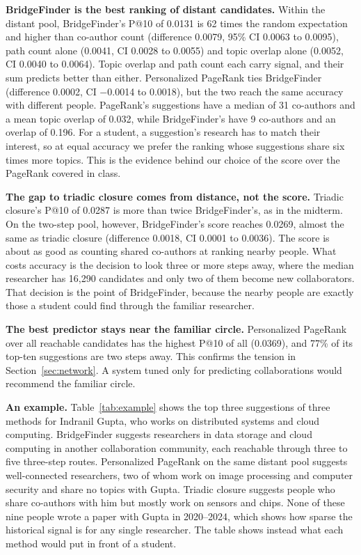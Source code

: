 \documentclass[sigconf,nonacm]{acmart}
\begin{document}
\textbf{BridgeFinder is the best ranking of distant candidates.} Within the distant pool, BridgeFinder's P@10 of 0.0131 is 62 times the random expectation and higher than co-author count (difference 0.0079, 95\% CI 0.0063 to 0.0095), path count alone (0.0041, CI 0.0028 to 0.0055) and topic overlap alone (0.0052, CI 0.0040 to 0.0064). Topic overlap and path count each carry signal, and their sum predicts better than either. Personalized PageRank ties BridgeFinder (difference 0.0002, CI $-$0.0014 to 0.0018), but the two reach the same accuracy with different people. PageRank's suggestions have a median of 31 co-authors and a mean topic overlap of 0.032, while BridgeFinder's have 9 co-authors and an overlap of 0.196. For a student, a suggestion's research has to match their interest, so at equal accuracy we prefer the ranking whose suggestions share six times more topics. This is the evidence behind our choice of the score over the PageRank covered in class.

\textbf{The gap to triadic closure comes from distance, not the score.} Triadic closure's P@10 of 0.0287 is more than twice BridgeFinder's, as in the midterm. On the two-step pool, however, BridgeFinder's score reaches 0.0269, almost the same as triadic closure (difference 0.0018, CI 0.0001 to 0.0036). The score is about as good as counting shared co-authors at ranking nearby people. What costs accuracy is the decision to look three or more steps away, where the median researcher has 16,290 candidates and only two of them become new collaborators. That decision is the point of BridgeFinder, because the nearby people are exactly those a student could find through the familiar researcher.

\textbf{The best predictor stays near the familiar circle.} Personalized PageRank over all reachable candidates has the highest P@10 of all (0.0369), and 77\% of its top-ten suggestions are two steps away. This confirms the tension in Section~\ref{sec:network}. A system tuned only for predicting collaborations would recommend the familiar circle.

\textbf{An example.} Table~\ref{tab:example} shows the top three suggestions of three methods for Indranil Gupta, who works on distributed systems and cloud computing. BridgeFinder suggests researchers in data storage and cloud computing in another collaboration community, each reachable through three to five three-step routes. Personalized PageRank on the same distant pool suggests well-connected researchers, two of whom work on image processing and computer security and share no topics with Gupta. Triadic closure suggests people who share co-authors with him but mostly work on sensors and chips. None of these nine people wrote a paper with Gupta in 2020--2024, which shows how sparse the historical signal is for any single researcher. The table shows instead what each method would put in front of a student.
\end{document}
